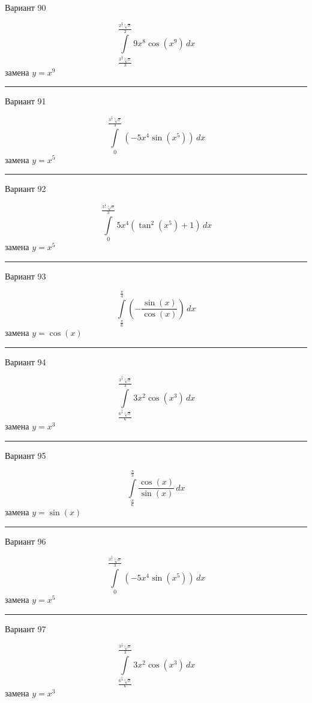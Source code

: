 \documentclass[11pt]{report}
\begin{document}
Вариант 90

$$\int\limits_{\frac{3^{\frac{8}{9}} \sqrt[9]{\pi}}{3}}^{\frac{2^{\frac{8}{9}} \sqrt[9]{\pi}}{2}} 9 x^{8} \cos{\left(x^{9} \right)}\, dx$$
замена $y = x^{9}$



\rule{\textwidth}{.2mm}

Вариант 91

$$\int\limits_{0}^{\frac{3^{\frac{4}{5}} \sqrt[5]{\pi}}{3}} \left(- 5 x^{4} \sin{\left(x^{5} \right)}\right)\, dx$$
замена $y = x^{5}$



\rule{\textwidth}{.2mm}

Вариант 92

$$\int\limits_{0}^{\frac{3^{\frac{4}{5}} \sqrt[5]{\pi}}{3}} 5 x^{4} \left(\tan^{2}{\left(x^{5} \right)} + 1\right)\, dx$$
замена $y = x^{5}$



\rule{\textwidth}{.2mm}

Вариант 93

$$\int\limits_{\frac{\pi}{6}}^{\frac{\pi}{4}} \left(- \frac{\sin{\left(x \right)}}{\cos{\left(x \right)}}\right)\, dx$$
замена $y = \cos{\left(x \right)}$



\rule{\textwidth}{.2mm}

Вариант 94

$$\int\limits_{\frac{6^{\frac{2}{3}} \sqrt[3]{\pi}}{6}}^{\frac{3^{\frac{2}{3}} \sqrt[3]{\pi}}{3}} 3 x^{2} \cos{\left(x^{3} \right)}\, dx$$
замена $y = x^{3}$



\rule{\textwidth}{.2mm}

Вариант 95

$$\int\limits_{\frac{\pi}{6}}^{\frac{\pi}{3}} \frac{\cos{\left(x \right)}}{\sin{\left(x \right)}}\, dx$$
замена $y = \sin{\left(x \right)}$



\rule{\textwidth}{.2mm}

Вариант 96

$$\int\limits_{0}^{\frac{3^{\frac{4}{5}} \sqrt[5]{\pi}}{3}} \left(- 5 x^{4} \sin{\left(x^{5} \right)}\right)\, dx$$
замена $y = x^{5}$



\rule{\textwidth}{.2mm}

Вариант 97

$$\int\limits_{\frac{6^{\frac{2}{3}} \sqrt[3]{\pi}}{6}}^{\frac{3^{\frac{2}{3}} \sqrt[3]{\pi}}{3}} 3 x^{2} \cos{\left(x^{3} \right)}\, dx$$
замена $y = x^{3}$
\end{document}
